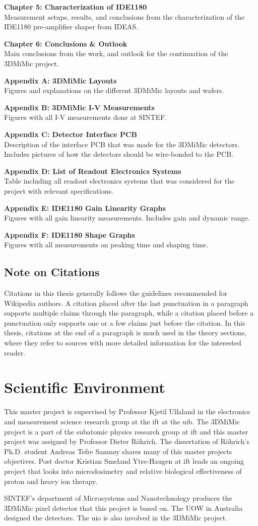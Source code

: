 \documentclass[../main/thesis.tex]{subfiles}
\begin{document}
\textbf{Chapter 5: Characterization of IDE1180}\\
Measurement setups, results, and conclusions from the characterization of the IDE1180 pre-amplifier shaper from IDEAS.

\textbf{Chapter 6: Conclusions \& Outlook}\\
Main conclusions from the work, and outlook for the continuation of the 3DMiMic project.

\textbf{Appendix A: 3DMiMic Layouts}\\
Figures and explanations on the different 3DMiMic layouts and wafers. 

\textbf{Appendix B: 3DMiMic I-V Measurements}\\
Figures with all I-V measurements done at SINTEF.

\textbf{Appendix C: Detector Interface PCB}\\
Description of the interface PCB that was made for the 3DMiMic detectors. Includes pictures of how the detectors should be wire-bonded to the PCB. 

\textbf{Appendix D: List of Readout Electronics Systems}\\
Table including all readout electronics systems that was considered for the project with relevant specifications. 

\textbf{Appendix E: IDE1180 Gain Linearity Graphs}\\
Figures with all gain linearity measurements. Includes gain and dynamic range.

\textbf{Appendix F: IDE1180 Shape Graphs}\\
Figures with all measurements on peaking time and shaping time.


\subsection{Note on Citations}
Citations in this thesis generally follows the guidelines recommended for Wikipedia authors. A citation placed after the last punctuation in a paragraph supports multiple claims through the paragraph, while a citation placed before a punctuation only supports one or a few claims just before the citation. In this thesis, citations at the end of a paragraph is much used in the theory sections, where they refer to sources with more detailed information for the interested reader.

\newpage
\section{Scientific Environment}
\label{i-environment}
This master project is supervised by Professor Kjetil Ullaland in the electronics and measurement science research group at the \gls{ift} at the \gls{uib}. The 3DMiMic project is a part of the subatomic physics research group at \gls{ift} and this master project was assigned by Professor Dieter Röhrich. The dissertation of Röhrich's Ph.D. student Andreas Tefre Samnøy shares many of this master projects objectives. Post doctor Kristian Smeland Ytre-Haugen at \gls{ift} leads an ongoing project that looks into microdosimetry and relative biological effectiveness of proton and heavy ion therapy. 

SINTEF's department of Microsystems and Nanotechnology produces the 3DMiMic pixel detector that this project is based on. The \gls{UOW} in Australia designed the detectors. The \gls{uio} is also involved in the 3DMiMic project. 

\end{document}

